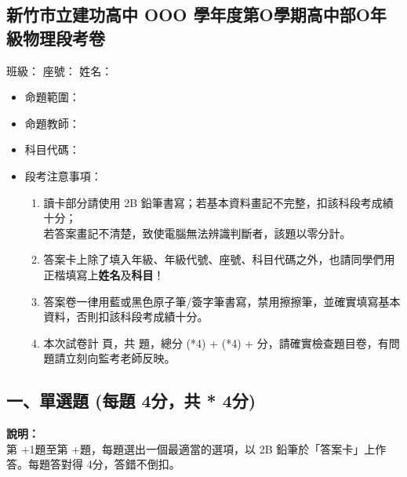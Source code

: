\documentclass[10pt,a4paper]{article}
\newcommand{\scscore}{4}
\newcommand{\mcscore}{4}
\newcommand{\examheader}{
    \begin{center}
        \section*{新竹市立建功高中 OOO 學年度第O學期高中部O年級物理段考卷}
    \end{center}
}
\begin{document}
\examheader

\noindent \hspace*{\fill} \large 班級：\underline{\hspace{1.5cm}} 座號：\underline{\hspace{1cm}} 姓名：\underline{\hspace{2.5cm}}

\vspace{1em}

\begin{itemize}[leftmargin=1em]
    \item[$\ast$] 命題範圍：
    \item[$\ast$] 命題教師：
    \item[$\ast$] 科目代碼：
    \item[$\ast$] 段考注意事項：
    \begin{enumerate}[label=\arabic*., leftmargin=2em]
        \item 讀卡部分請使用 2B 鉛筆書寫；若基本資料畫記不完整，扣該科段考成績十分；\\若答案畫記不清楚，致使電腦無法辨識判斷者，該題以零分計。
        \item 答案卡上除了填入年級、年級代號、座號、科目代碼之外，也請同學們用正楷填寫上\textbf{姓名}及\textbf{科目}！
        \item 答案卷一律用藍或黑色原子筆/簽字筆書寫，禁用擦擦筆，並確實填寫基本資料，否則扣該科段考成績十分。
        \item 本次試卷計 \pageref{EndOfExam} 頁，共  題，總分 \the\numexpr (*\scscore) + (*\mcscore) +  \relax 分，請確實檢查題目卷，有問題請立刻向監考老師反映。
    \end{enumerate}
\end{itemize}

\subsection*{一、單選題 (每題 \scscore 分，共 \the\numexpr {} * \scscore \relax 分)}
\begin{center}
    \begin{tcolorbox}[colframe=black, colback=white, halign=left, width=\textwidth, arc=2mm]
        \small \textbf{說明：} \\
        第 \the\numexpr\value{qcount}+1\relax 題至第 \the\numexpr\value{qcount}+\relax 題，每題選出一個最適當的選項，以 2B 鉛筆於「答案卡」上作答。每題答對得 \scscore 分，答錯不倒扣。 \\
    \end{tcolorbox}
\end{center}
\end{document}
